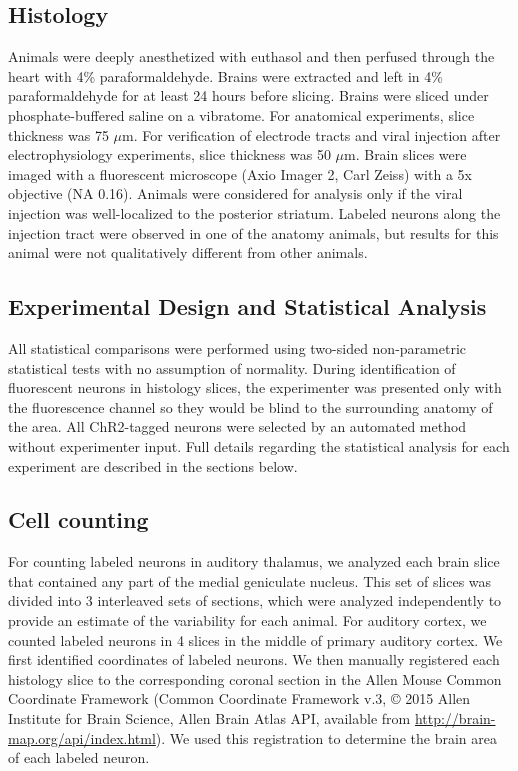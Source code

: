 \subsection{Histology}
Animals were deeply anesthetized with euthasol and then perfused through the heart with 4\% paraformaldehyde.
%
Brains were extracted and left in 4\% paraformaldehyde for at least 24 hours before slicing. 
%
Brains were sliced under phosphate-buffered saline on a vibratome. 
%
For anatomical experiments, slice thickness was 75 $\mu$m. 
%
For verification of electrode tracts and viral injection after electrophysiology experiments, slice thickness was 50 $\mu$m.
%
Brain slices were imaged with a fluorescent microscope (Axio Imager 2, Carl Zeiss) with a 5x objective (NA 0.16).
%
Animals were considered for analysis only if the viral injection was well-localized to the posterior striatum. Labeled neurons along the injection tract were observed in one of the anatomy animals, but results for this animal were not qualitatively different from other animals.

\subsection{Experimental Design and Statistical Analysis}
All statistical comparisons were performed using two-sided non-parametric statistical tests with no assumption of normality.
%
During identification of fluorescent neurons in histology slices, the experimenter was presented only with the fluorescence channel so they would be blind to the surrounding anatomy of the area. 
%
All ChR2-tagged neurons were selected by an automated method without experimenter input.
Full details regarding the statistical analysis for each experiment are described in the sections below. 


\subsection{Cell counting}
%
For counting labeled neurons in auditory thalamus, we analyzed each brain slice that contained any part of the medial geniculate nucleus. 
%
This set of slices was divided into 3 interleaved sets of sections, which were analyzed independently to provide an estimate of the variability for each animal.
%
For auditory cortex, we counted labeled neurons in 4 slices in the middle of primary auditory cortex.
%
We first identified coordinates of labeled neurons.
%
We then manually registered each histology slice to the corresponding coronal section in the Allen Mouse Common Coordinate Framework (Common Coordinate Framework v.3, © 2015 Allen Institute for Brain Science, Allen Brain Atlas API, available from \url{http://brain-map.org/api/index.html}). 
%
We used this registration to determine the brain area of each labeled neuron.


